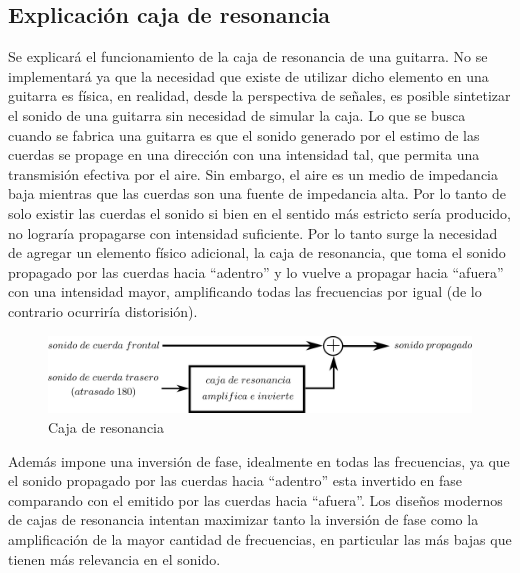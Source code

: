 \documentclass[assd_tp2_main.tex]{subfiles}
\begin{document}
\subsection{Explicación caja de resonancia}
Se explicará el funcionamiento de la caja de resonancia de una guitarra. No se implementar\'a ya que la necesidad que existe de utilizar dicho elemento en una guitarra es física, en realidad, desde la perspectiva de señales, es posible sintetizar el sonido de una guitarra sin necesidad de simular la caja.
Lo que se busca cuando se fabrica una guitarra es que el sonido generado por el estimo de las cuerdas se propage en una dirección con una intensidad tal, que permita una transmisión efectiva por el aire.
Sin embargo, el aire es un medio de impedancia baja mientras que las cuerdas son una fuente de impedancia alta. Por lo tanto de solo existir las cuerdas el sonido si bien en el sentido más estricto sería producido, no lograría propagarse con intensidad suficiente. 
Por lo tanto surge la necesidad de agregar un elemento f\'isico adicional, la caja de resonancia, que toma el sonido propagado por las cuerdas hacia ``adentro'' y lo vuelve a propagar hacia ``afuera'' con una intensidad mayor, amplificando todas las frecuencias por igual (de lo contrario ocurrir\'ia distorisi\'on). 
\begin{figure}[H]
	\begin{center}
	\includegraphics[scale=1.2]{graficos/caja_resonancia.png}
	\caption{Caja de resonancia}

	\end{center}
\end{figure}
Además impone una inversi\'on de fase, idealmente en todas las frecuencias, ya que el sonido propagado por las cuerdas hacia ``adentro'' esta invertido en fase comparando con el emitido por las cuerdas hacia ``afuera''.
Los dise\~nos modernos de cajas de resonancia intentan maximizar tanto la inversión de fase como la amplificación de la mayor cantidad de frecuencias, en particular las m\'as bajas que tienen m\'as relevancia en el sonido.
\end{document}
